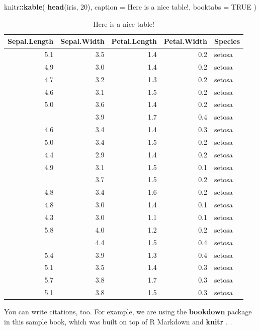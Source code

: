 \documentclass[
]{book}
\newenvironment{Shaded}{\begin{snugshade}}{\end{snugshade}}
\newcommand{\AttributeTok}[1]{\textcolor[rgb]{0.13,0.29,0.53}{#1}}
\newcommand{\ConstantTok}[1]{\textcolor[rgb]{0.56,0.35,0.01}{#1}}
\newcommand{\DecValTok}[1]{\textcolor[rgb]{0.00,0.00,0.81}{#1}}
\newcommand{\FunctionTok}[1]{\textcolor[rgb]{0.13,0.29,0.53}{\textbf{#1}}}
\newcommand{\NormalTok}[1]{#1}
\newcommand{\SpecialCharTok}[1]{\textcolor[rgb]{0.81,0.36,0.00}{\textbf{#1}}}
\newcommand{\StringTok}[1]{\textcolor[rgb]{0.31,0.60,0.02}{#1}}
\begin{document}
\begin{Shaded}
\begin{Highlighting}[]
\NormalTok{knitr}\SpecialCharTok{::}\FunctionTok{kable}\NormalTok{(}
  \FunctionTok{head}\NormalTok{(iris, }\DecValTok{20}\NormalTok{), }\AttributeTok{caption =} \StringTok{\textquotesingle{}Here is a nice table!\textquotesingle{}}\NormalTok{,}
  \AttributeTok{booktabs =} \ConstantTok{TRUE}
\NormalTok{)}
\end{Highlighting}
\end{Shaded}

\begin{table}

\caption{\label{tab:nice-tab}Here is a nice table!}
\centering
\begin{tabular}[t]{rrrrl}
\toprule
Sepal.Length & Sepal.Width & Petal.Length & Petal.Width & Species\\
\midrule
5.1 & 3.5 & 1.4 & 0.2 & setosa\\
4.9 & 3.0 & 1.4 & 0.2 & setosa\\
4.7 & 3.2 & 1.3 & 0.2 & setosa\\
4.6 & 3.1 & 1.5 & 0.2 & setosa\\
5.0 & 3.6 & 1.4 & 0.2 & setosa\\
\addlinespace
5.4 & 3.9 & 1.7 & 0.4 & setosa\\
4.6 & 3.4 & 1.4 & 0.3 & setosa\\
5.0 & 3.4 & 1.5 & 0.2 & setosa\\
4.4 & 2.9 & 1.4 & 0.2 & setosa\\
4.9 & 3.1 & 1.5 & 0.1 & setosa\\
\addlinespace
5.4 & 3.7 & 1.5 & 0.2 & setosa\\
4.8 & 3.4 & 1.6 & 0.2 & setosa\\
4.8 & 3.0 & 1.4 & 0.1 & setosa\\
4.3 & 3.0 & 1.1 & 0.1 & setosa\\
5.8 & 4.0 & 1.2 & 0.2 & setosa\\
\addlinespace
5.7 & 4.4 & 1.5 & 0.4 & setosa\\
5.4 & 3.9 & 1.3 & 0.4 & setosa\\
5.1 & 3.5 & 1.4 & 0.3 & setosa\\
5.7 & 3.8 & 1.7 & 0.3 & setosa\\
5.1 & 3.8 & 1.5 & 0.3 & setosa\\
\bottomrule
\end{tabular}
\end{table}

You can write citations, too. For example, we are using the \textbf{bookdown} package \citep{R-bookdown} in this sample book, which was built on top of R Markdown and \textbf{knitr} \citep{xie2015}.
.
\end{document}
